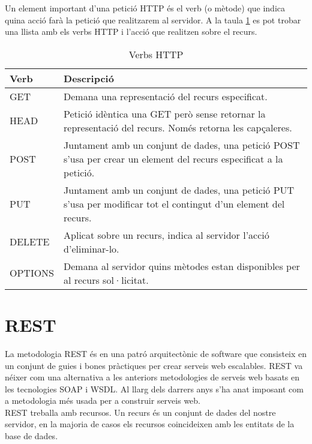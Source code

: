 Un element important d'una petició \ac{HTTP} és el verb (o mètode) que indica quina acció farà la petició que realitzarem al servidor. A la taula \ref{table:verbs_http} es pot trobar una llista amb els verbs \ac{HTTP} i l'acció que realitzen sobre el recurs.

\begin{table}[h!]
 	\begin{center}
 		\begin{tabularx}{\textwidth}{|l|X|}
  			\hline
 			\bfseries Verb & \bfseries Descripció \\ \hline
			GET &  Demana una representació del recurs especificat. \\ \hline
			HEAD & Petició idèntica una GET però sense retornar la representació del recurs. Només retorna les capçaleres.\\ \hline
			POST & Juntament amb un conjunt de dades, una petició POST s'usa per crear un element del recurs especificat a la petició.\\ \hline
			PUT & Juntament amb un conjunt de dades, una petició PUT s'usa per modificar tot el contingut d'un element del recurs.\\ \hline
			DELETE & Aplicat sobre un recurs, indica al servidor l'acció d'eliminar-lo.\\ \hline
			OPTIONS & Demana al servidor quins mètodes estan disponibles per al recurs sol·licitat.\\ \hline
		\end{tabularx}
	\end{center}
	\caption{Verbs \ac{HTTP}} 
	\label{table:verbs_http}
\end{table}
\section{\ac{REST}}
La metodologia \ac{REST} és en una patró arquitectònic de software que consisteix en un conjunt de guies i bones pràctiques per crear serveis web escalables. \ac{REST} va néixer com una alternativa a les anteriors metodologies de serveis web basats en les tecnologies \ac{SOAP} i \ac{WSDL}. Al llarg dels darrers anys s'ha anat imposant com a metodologia més usada per a construir serveis web.\\

\ac{REST} treballa amb recursos. Un recurs és un conjunt de dades del nostre servidor, en la majoria de casos els recursos coincideixen amb les entitats de la base de dades.\\

